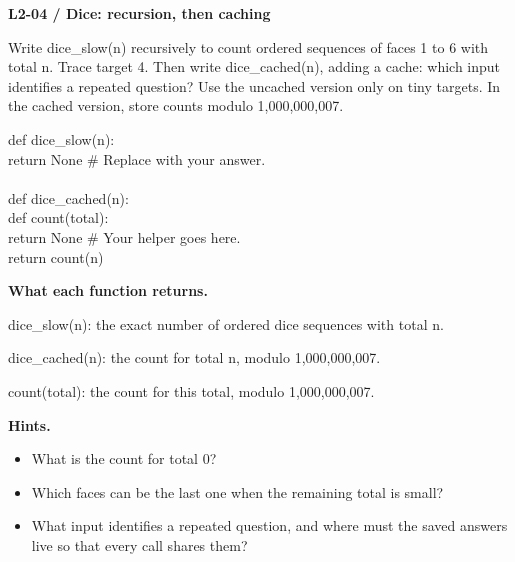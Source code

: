 \documentclass[11pt,a4paper]{article}
\begin{document}
\par\noindent\begin{minipage}{\linewidth}
\textbf{L2-04 / Dice: recursion, then caching}\par\smallskip Write dice\_slow(n) recursively to count ordered sequences of faces 1 to 6 with total n. Trace target 4. Then write dice\_cached(n), adding a cache: which input identifies a repeated question? Use the uncached version only on tiny targets. In the cached version, store counts modulo 1,000,000,007.\par
\par{}\par\smallskip\noindent\colorbox{codepaper}{\parbox{\dimexpr\linewidth-2\fboxsep\relax}{\small\ttfamily\raggedright def dice\_slow(n):\\\hspace*{2.4em}return None  \# Replace with your answer.\\\mbox{}\\def dice\_cached(n):\\\hspace*{2.4em}def count(total):\\\hspace*{4.8em}return None  \# Your helper goes here.\\\hspace*{2.4em}return count(n)}}\par
{\small\textbf{What each function returns.}\par dice\_slow(n): the exact number of ordered dice sequences with total n.\par dice\_cached(n): the count for total n, modulo 1,000,000,007.\par count(total): the count for this total, modulo 1,000,000,007.\par }
{\small\textbf{Hints.}}\begin{itemize}\item What is the count for total 0?\item Which faces can be the last one when the remaining total is small?\item What input identifies a repeated question, and where must the saved answers live so that every call shares them?\end{itemize}
\end{minipage}\par\vspace{4mm}
\end{document}
